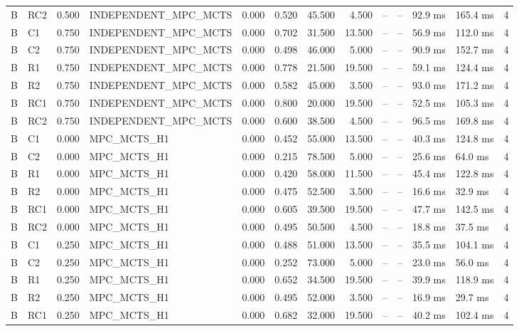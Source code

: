 \begin{table}
{\begin{tabular}{llrlrrrrrrllr}
B & RC2 & 0.500 & INDEPENDENT\_MPC\_MCTS & 0.000 & 0.520 & 45.500 & 4.500 & -- & -- & 92.9 ms & 165.4 ms & 4 \\
B & C1 & 0.750 & INDEPENDENT\_MPC\_MCTS & 0.000 & 0.702 & 31.500 & 13.500 & -- & -- & 56.9 ms & 112.0 ms & 4 \\
B & C2 & 0.750 & INDEPENDENT\_MPC\_MCTS & 0.000 & 0.498 & 46.000 & 5.000 & -- & -- & 90.9 ms & 152.7 ms & 4 \\
B & R1 & 0.750 & INDEPENDENT\_MPC\_MCTS & 0.000 & 0.778 & 21.500 & 19.500 & -- & -- & 59.1 ms & 124.4 ms & 4 \\
B & R2 & 0.750 & INDEPENDENT\_MPC\_MCTS & 0.000 & 0.582 & 45.000 & 3.500 & -- & -- & 93.0 ms & 171.2 ms & 4 \\
B & RC1 & 0.750 & INDEPENDENT\_MPC\_MCTS & 0.000 & 0.800 & 20.000 & 19.500 & -- & -- & 52.5 ms & 105.3 ms & 4 \\
B & RC2 & 0.750 & INDEPENDENT\_MPC\_MCTS & 0.000 & 0.600 & 38.500 & 4.500 & -- & -- & 96.5 ms & 169.8 ms & 4 \\
B & C1 & 0.000 & MPC\_MCTS\_H1 & 0.000 & 0.452 & 55.000 & 13.500 & -- & -- & 40.3 ms & 124.8 ms & 4 \\
B & C2 & 0.000 & MPC\_MCTS\_H1 & 0.000 & 0.215 & 78.500 & 5.000 & -- & -- & 25.6 ms & 64.0 ms & 4 \\
B & R1 & 0.000 & MPC\_MCTS\_H1 & 0.000 & 0.420 & 58.000 & 11.500 & -- & -- & 45.4 ms & 122.8 ms & 4 \\
B & R2 & 0.000 & MPC\_MCTS\_H1 & 0.000 & 0.475 & 52.500 & 3.500 & -- & -- & 16.6 ms & 32.9 ms & 4 \\
B & RC1 & 0.000 & MPC\_MCTS\_H1 & 0.000 & 0.605 & 39.500 & 19.500 & -- & -- & 47.7 ms & 142.5 ms & 4 \\
B & RC2 & 0.000 & MPC\_MCTS\_H1 & 0.000 & 0.495 & 50.500 & 4.500 & -- & -- & 18.8 ms & 37.5 ms & 4 \\
B & C1 & 0.250 & MPC\_MCTS\_H1 & 0.000 & 0.488 & 51.000 & 13.500 & -- & -- & 35.5 ms & 104.1 ms & 4 \\
B & C2 & 0.250 & MPC\_MCTS\_H1 & 0.000 & 0.252 & 73.000 & 5.000 & -- & -- & 23.0 ms & 56.0 ms & 4 \\
B & R1 & 0.250 & MPC\_MCTS\_H1 & 0.000 & 0.652 & 34.500 & 19.500 & -- & -- & 39.9 ms & 118.9 ms & 4 \\
B & R2 & 0.250 & MPC\_MCTS\_H1 & 0.000 & 0.495 & 52.000 & 3.500 & -- & -- & 16.9 ms & 29.7 ms & 4 \\
B & RC1 & 0.250 & MPC\_MCTS\_H1 & 0.000 & 0.682 & 32.000 & 19.500 & -- & -- & 40.2 ms & 102.4 ms & 4 \\

\end{tabular}}
\end{table}
